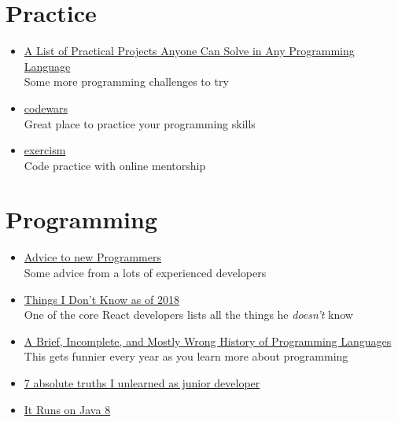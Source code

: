 \section*{Practice}

\begin{itemize}[leftmargin=*]
    \item
        \href{https://github.com/karan/Projects}{A List of Practical Projects Anyone Can Solve in Any Programming Language}\\
        Some more programming challenges to try
    \item
        \href{https://www.codewars.com}{codewars}\\
        Great place to practice your programming skills
    \item
        \href{https://exercism.io}{exercism}\\
        Code practice with online mentorship
\end{itemize}

\section*{Programming}

\begin{itemize}[leftmargin=*]
    \item
        \href{http://olafurw.com/2019-01-27-programmer-advice/}{Advice to new Programmers}\\
        Some advice from a lots of experienced developers
    \item
        \href{https://overreacted.io/things-i-dont-know-as-of-2018/}{Things I Don't Know as of 2018}\\
        One of the core React developers lists all the things he \textit{doesn't} know
    \item
        \href{http://james-iry.blogspot.com/2009/05/brief-incomplete-and-mostly-wrong.html}{A Brief, Incomplete, and Mostly Wrong History of Programming Languages}\\
        This gets funnier every year as you learn more about programming
    \item
        \href{https://monicalent.com/blog/2019/06/03/absolute-truths-unlearned-as-junior-developer/}{7 absolute truths I unlearned as junior developer}
    \item
        \href{https://veekaybee.github.io/2019/05/10/java8/}{It Runs on Java 8}
\end{itemize}

